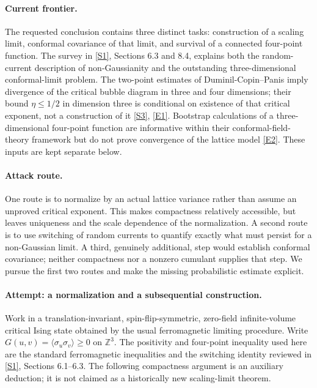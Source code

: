 \documentclass[11pt,a4paper]{article}
\newcommand{\Z}{\mathbb{Z}}
\newcommand{\sref}[2]{\hyperlink{source:#1:#2}{[S#2]}}
\newcommand{\eref}[2]{\hyperlink{extra:#1:#2}{[E#2]}}
\numberwithin{equation}{section}
\begin{document}
\paragraph{Current frontier.}
The requested conclusion contains three distinct tasks: construction of a
scaling limit, conformal covariance of that limit, and survival of a connected
four-point function. The survey in \sref{statement}{1}, Sections 6.3 and 8.4, explains
both the random-current description of non-Gaussianity and the outstanding
three-dimensional conformal-limit problem. The two-point estimates of
Duminil-Copin--Panis imply divergence of the critical bubble diagram in
three and four dimensions; their bound $\eta\le 1/2$ in dimension three is
conditional on existence of that critical exponent, not a construction of
it \sref{statement}{3}, \eref{statement}{1}. Bootstrap calculations of a three-dimensional
four-point function are informative within their conformal-field-theory
framework but do not prove convergence of the lattice model
\eref{statement}{2}. These inputs are kept separate below.

\paragraph{Attack route.}
One route is to normalize by an actual lattice variance rather than assume
an unproved critical exponent. This makes compactness relatively accessible,
but leaves uniqueness and the scale dependence of the normalization.
A second route is to use switching of random currents to quantify exactly
what must persist for a non-Gaussian limit. A third, genuinely additional,
step would establish conformal covariance; neither compactness nor a
nonzero cumulant supplies that step. We pursue the first two routes and
make the missing probabilistic estimate explicit.

\paragraph{Attempt: a normalization and a subsequential construction.}
Work in a translation-invariant, spin-flip-symmetric, zero-field infinite-volume
critical Ising state obtained by the usual ferromagnetic limiting procedure.
Write $G(u,v)=\langle\sigma_u\sigma_v\rangle\ge0$ on $\Z^3$.
The positivity and four-point inequality used here are the standard
ferromagnetic inequalities and the switching identity reviewed in
\sref{statement}{1}, Sections 6.1--6.3. The following compactness argument is an
auxiliary deduction; it is not claimed as a historically new scaling-limit
theorem.
\end{document}
